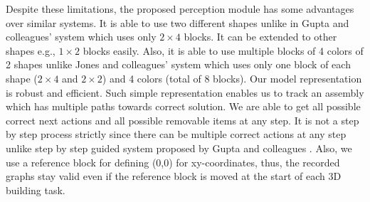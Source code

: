 Despite these limitations, the proposed perception module has some advantages over similar systems. It is able to use two different shapes unlike in Gupta and colleagues' system \parencite{gupta2012duplotrack} which uses only $2 \times 4$ blocks. It can be extended to other shapes e.g., $1 \times 2$ blocks easily. Also, it is able to use multiple blocks of 4 colors of 2 shapes unlike Jones and colleagues' system \parencite{jones2019toward}  which uses only one block of each shape ($2 \times 4$ and $2 \times 2$) and 4 colors (total of 8 blocks). Our model representation is robust and efficient. Such simple representation enables us to track an assembly which has multiple paths towards correct solution. We are able to get all possible correct next actions and all possible removable items at any step. It is not a step by step process strictly since there can be multiple correct actions at any step unlike step by step guided system proposed by Gupta and colleagues \parencite{gupta2012duplotrack}. Also, we use a reference block for defining (0,0) for xy-coordinates, thus, the recorded graphs stay valid even if the reference block is moved at the start of each 3D building task.  




